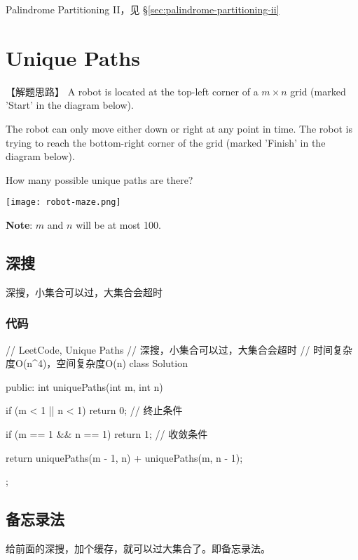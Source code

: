 \begindot
\item Palindrome Partitioning II，见 \S \ref{sec:palindrome-partitioning-ii}
\myenddot


\section{Unique Paths} %
\label{sec:unique-paths}


【解题思路】
A robot is located at the top-left corner of a $m \times n$ grid (marked 'Start' in the diagram below).

The robot can only move either down or right at any point in time. The robot is trying to reach the bottom-right corner of the grid (marked 'Finish' in the diagram below).

How many possible unique paths are there?

\begin{center}
	\texttt{[image: robot-maze.png]}\\
	\label{fig:unique-paths}
\end{center}

\textbf{Note}: $m$ and $n$ will be at most 100.


\subsection{深搜}
深搜，小集合可以过，大集合会超时

\subsubsection{代码}
\begin{Code}
	// LeetCode, Unique Paths
	// 深搜，小集合可以过，大集合会超时
	// 时间复杂度O(n^4)，空间复杂度O(n)
	class Solution {
		public:
		int uniquePaths(int m, int n) {
			if (m < 1 || n < 1) return 0; // 终止条件
			
			if (m == 1 && n == 1) return 1; // 收敛条件
			
			return uniquePaths(m - 1, n) + uniquePaths(m, n - 1);
		}
	};
\end{Code}


\subsection{备忘录法}
给前面的深搜，加个缓存，就可以过大集合了。即备忘录法。

